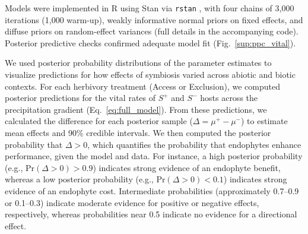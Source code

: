 \documentclass[12pt]{article}\usepackage[]{graphicx}\usepackage[dvipsnames]{xcolor}
\begin{document}
Models were implemented in R \citep{RCoreTeam} using Stan via \texttt{rstan} \citep{Rstan}, with four chains of 3,000 iterations (1,000 warm-up), weakly informative normal priors on fixed effects, and diffuse priors on random-effect variances (full details in the accompanying code). 
Posterior predictive checks confirmed adequate model fit (Fig.~\ref{sup:ppc_vital}).

We used posterior probability distributions of the parameter estimates to visualize predictions for how effects of symbiosis varied across abiotic and biotic contexts.
For each herbivory treatment (Access or Exclusion), we computed posterior predictions for the vital rates of $S^+$ and $S^-$ hosts across the precipitation gradient (Eq.~\ref{eq:full_model}).
From these predictions, we calculated the difference for each posterior sample ($\Delta = \mu^{+} - \mu^{-}$) to estimate mean effects and 90\% credible intervals.
We then computed the posterior probability that $\Delta > 0$, which quantifies the probability that endophytes enhance performance, given the model and data.
For instance, a high posterior probability (e.g., Pr$(\Delta>0) >0.9$) indicates strong evidence of an endophyte benefit, whereas a low posterior probability (e.g., Pr$(\Delta>0) <0.1$) indicates strong evidence of an endophyte cost.
Intermediate probabilities (approximately 0.7--0.9 or 0.1--0.3) indicate moderate evidence for positive or negative effects, respectively, whereas probabilities near 0.5 indicate no evidence for a directional effect.
\end{document}
